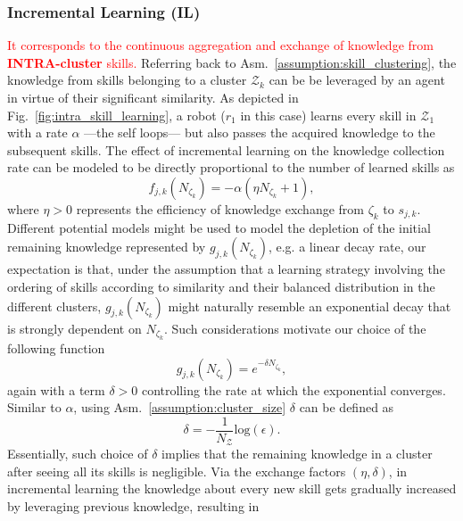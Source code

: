 \subsubsection{\textbf{Incremental Learning (IL)}}
\textcolor{red}{It corresponds to the continuous aggregation and exchange of knowledge from \textbf{INTRA-cluster} skills.} Referring back to Asm.~\ref{assumption:skill_clustering}, the knowledge from skills belonging to a cluster ${\mathcal{Z}_k}$ can be be leveraged by an agent in virtue of their significant similarity. As depicted in Fig.~\ref{fig:intra_skill_learning}, a robot ($r_1$ in this case) learns every skill in $\mathcal{Z}_1$ with a rate $\alpha$ ---the self loops--- but also passes the acquired knowledge to the subsequent skills. The effect of incremental learning on the knowledge collection rate can be modeled to be directly proportional to the number of learned skills as
\begin{equation}\label{eq:f_function_incremental}
	f_{j,k}\left(N_{\zeta_k}\right) = -\alpha\left(\eta N_{\zeta_k} + 1 \right), 
\end{equation}
where $\eta>0$ represents the efficiency of knowledge exchange from $\zeta_k$ to $s_{j,k}$. Different potential models might be used to model the depletion of the initial remaining knowledge represented by $g_{j,k}\left(N_{\zeta_k}\right)$, e.g. a linear decay rate, our expectation is that, under the assumption that a learning strategy involving the ordering of skills according to similarity and their balanced distribution in the different clusters, $g_{j,k}\left(N_{\zeta_k}\right)$ might naturally resemble an exponential decay that is strongly dependent on $N_{\zeta_k}$. Such considerations motivate our choice of the following function
\begin{equation}\label{eq:g_function_incremental}
	g_{j,k}\left(N_{\zeta_k}\right) = e^{-\delta N_{\zeta_k}},
\end{equation}
again with a term $\delta>0$ controlling the rate at which the exponential converges. Similar to $\alpha$, using Asm.~\ref{assumption:cluster_size} $\delta$ can be defined as 
\begin{equation}\label{eq:delta}
	\delta = -\frac{1}{N_\mathcal{Z}}\text{log}(\epsilon).
\end{equation}
Essentially, such choice of $\delta$ implies that the remaining knowledge in a cluster after seeing all its skills is negligible. Via the exchange factors $(\eta,\delta)$, in incremental learning the knowledge about every new skill gets gradually increased by leveraging previous knowledge, resulting in
